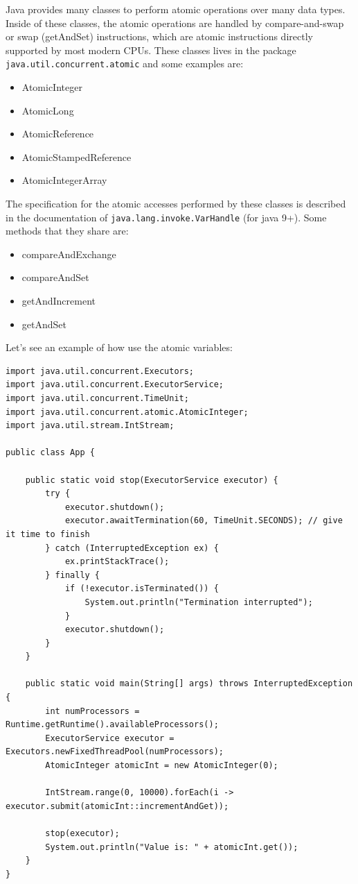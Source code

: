 \documentclass[openany, a4paper]{book}
\theoremstyle{break}
\theoremstyle{example}
\theoremstyle{note}
\theoremstyle{break}
\theoremstyle{exercise}
\begin{document}
Java provides many classes to perform atomic operations over many data
types. Inside of these classes, the atomic operations are handled by
compare-and-swap or swap (getAndSet) instructions, which are atomic
instructions directly supported by most modern CPUs. These classes lives in
the package \texttt{java.util.concurrent.atomic} and some examples are:

\begin{itemize}
\item AtomicInteger
\item AtomicLong
\item AtomicReference
\item AtomicStampedReference
\item AtomicIntegerArray
\end{itemize}

The specification for the atomic accesses performed by these classes is
described in the documentation of \texttt{java.lang.invoke.VarHandle} (for java
9+). Some methods that they share are:

\begin{itemize}
\item compareAndExchange
\item compareAndSet
\item getAndIncrement
\item getAndSet
\end{itemize}

Let's see an example of how use the atomic variables:

\begin{verbatim}
import java.util.concurrent.Executors;
import java.util.concurrent.ExecutorService;
import java.util.concurrent.TimeUnit;
import java.util.concurrent.atomic.AtomicInteger;
import java.util.stream.IntStream;

public class App {

    public static void stop(ExecutorService executor) {
        try {
            executor.shutdown();
            executor.awaitTermination(60, TimeUnit.SECONDS); // give it time to finish
        } catch (InterruptedException ex) {
            ex.printStackTrace();
        } finally {
            if (!executor.isTerminated()) {
                System.out.println("Termination interrupted");
            }
            executor.shutdown();
        }
    }

    public static void main(String[] args) throws InterruptedException {
        int numProcessors = Runtime.getRuntime().availableProcessors();
        ExecutorService executor = Executors.newFixedThreadPool(numProcessors);
        AtomicInteger atomicInt = new AtomicInteger(0);

        IntStream.range(0, 10000).forEach(i -> executor.submit(atomicInt::incrementAndGet));

        stop(executor);
        System.out.println("Value is: " + atomicInt.get());
    }
}
\end{verbatim}
\end{document}
